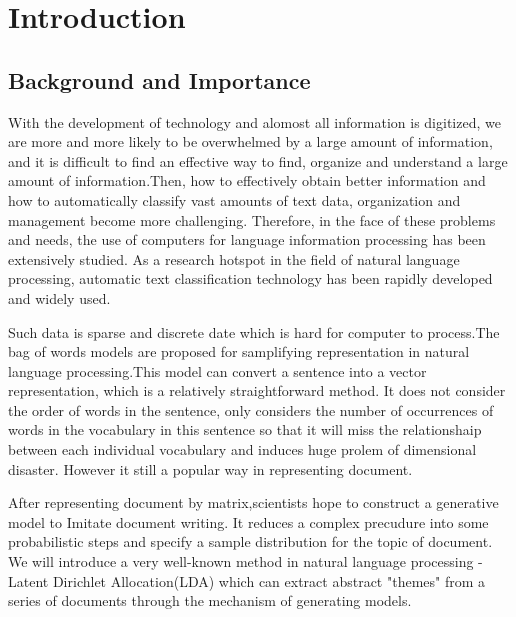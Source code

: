 \afterpage{\blankpage}

\chapter{Introduction}\label{s-intro}

\section{Background and Importance}
With the development of technology and alomost all information is digitized, we are more and more likely to be overwhelmed by a large amount of information, and it is difficult to find an effective way to find, organize and understand a large amount of information{\cite{intro-back}}.Then, how to effectively obtain better information and how to automatically classify vast amounts of text data, organization and management become more challenging. Therefore, in the face of these problems and needs, the use of computers for language information processing has been extensively studied. As a research hotspot in the field of natural language processing, automatic text classification technology has been rapidly developed and widely used.


Such data is sparse and discrete date which is hard for computer to process.The bag of words models are proposed for samplifying representation in natural language processing.This model can convert a sentence into a vector representation, which is a relatively straightforward method. It does not consider the order of words in the sentence, only considers the number of occurrences of words in the vocabulary in this sentence so that it will miss the relationshaip between each individual vocabulary and induces huge prolem of dimensional disaster. However it still a popular way in representing document.

After representing document by matrix,scientists hope to construct a generative model to
Imitate document writing. It reduces a complex precudure into some probabilistic steps and specify a sample  distribution for the topic of  document\cite{Finding scientific topics}. We will introduce  a very well-known method in natural language processing - Latent Dirichlet Allocation(LDA) which can extract  abstract "themes"  from a series of documents through the mechanism of generating models.


